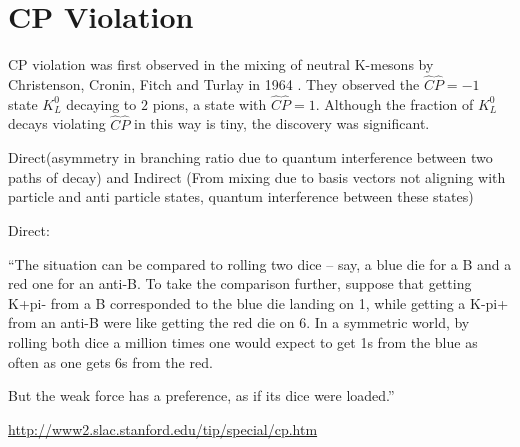 \section{CP Violation}

CP violation was first observed in the mixing of neutral K-mesons by Christenson, Cronin, Fitch and Turlay in 1964 \cite{FirstCPV}. They observed the $\hat{C}\hat{P} = -1$ state $K^{0}_L$ decaying to $2$ pions, a state with $\hat{C}\hat{P} = 1$. Although the fraction of $K^{0}_L$ decays violating $\hat{C}\hat{P}$ in this way is tiny, the discovery was significant.     

Direct(asymmetry in branching ratio due to quantum interference between two paths of decay) and Indirect (From mixing due to basis vectors not aligning with particle and anti particle states, quantum interference between these states)

Direct:

``The situation can be compared to rolling two dice – say, a blue die for a B and a red one for an anti-B.  To take the comparison further, suppose that getting K+pi- from a B corresponded to the blue die landing on 1, while getting a K-pi+ from an anti-B were like getting the red die on 6. In a symmetric world, by rolling both dice a million times one would expect to get 1s from the blue as often as one gets 6s from the red.

But the weak force has a preference, as if its dice were loaded.''

\url{http://www2.slac.stanford.edu/tip/special/cp.htm}


